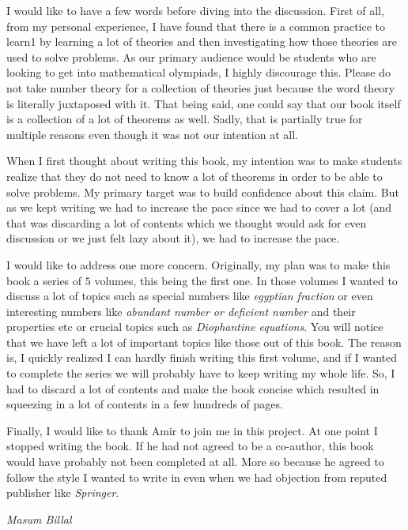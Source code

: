 \documentclass[12pt]{book}
\begin{document}
I would like to have a few words before diving into the discussion. First of all, from my personal experience, I have found that there is a common practice to learn1 by learning a lot of theories and then investigating how those theories are used to solve problems. As our primary audience would be students who are looking to get into mathematical olympiads, I highly discourage this. Please do not take number theory for a collection of theories just because the word theory is literally juxtaposed with it. That being said, one could say that our book itself is a collection of a lot of theorems as well. Sadly, that is partially true for multiple reasons even though it was not our intention at all.


When I first thought about writing this book, my intention was to make students realize that they do not need to know a lot of theorems in order to be able to solve problems. My primary target was to build confidence about this claim. But as we kept writing we had to increase the pace since we had to cover a lot (and that was  discarding a lot of contents which we thought would ask for even discussion or we just felt lazy about it), we had to increase the pace.


I would like to address one more concern. Originally, my plan was to make this book a series of $5$ volumes, this being the first one. In those volumes I wanted to discuss a lot of topics such as special numbers like \textit{egyptian fraction} or even interesting numbers like \textit{abundant number or deficient number} and their properties etc or crucial topics such as \textit{Diophantine equations}. You will notice that we have left a lot of important topics like those out of this book. The reason is, I quickly realized I can hardly finish writing this first volume, and if I wanted to complete the series we will probably have to keep writing my whole life. So, I had to discard a lot of contents and make the book concise which resulted in squeezing in a lot of contents in a few hundreds of pages. 


Finally, I would like to thank Amir to join me in this project. At one point I stopped writing the book. If he had not agreed to be a co-author, this book would have probably not been completed at all. More so because he agreed to follow the style I wanted to write in even when we had objection from reputed publisher like \textit{Springer}.

\begin{flushright}
	\sl Masum Billal
\end{flushright}
\end{document}
